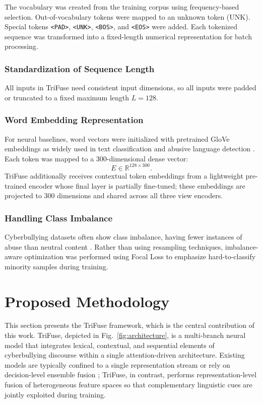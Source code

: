 The vocabulary was created from the training corpus using frequency-based selection. Out-of-vocabulary tokens were mapped to an unknown token (UNK). Special tokens \texttt{<PAD>}, \texttt{<UNK>}, \texttt{<BOS>}, and \texttt{<EOS>} were added. Each tokenized sequence was transformed into a fixed-length numerical representation for batch processing.

\subsubsection{Standardization of Sequence Length}

All inputs in TriFuse need consistent input dimensions, so all inputs were padded or truncated to a fixed maximum length $L = 128$.

\subsubsection{Word Embedding Representation}

For neural baselines, word vectors were initialized with pretrained GloVe embeddings as widely used in text classification and abusive language detection \cite{ref28, ref29}. Each token was mapped to a 300-dimensional dense vector:
\[
E \in \mathbb{R}^{128 \times 300}.
\]
TriFuse additionally receives contextual token embeddings from a lightweight pre-trained encoder whose final layer is partially fine-tuned; these embeddings are projected to 300 dimensions and shared across all three view encoders.

\subsubsection{Handling Class Imbalance}

Cyberbullying datasets often show class imbalance, having fewer instances of abuse than neutral content \cite{ref12}. Rather than using resampling techniques, imbalance-aware optimization was performed using Focal Loss \cite{ref23} to emphasize hard-to-classify minority samples during training.

\section{Proposed Methodology}

This section presents the TriFuse framework, which is the central contribution of this work. TriFuse, depicted in Fig.~\ref{fig:architecture}, is a multi-branch neural model that integrates lexical, contextual, and sequential elements of cyberbullying discourse within a single attention-driven architecture. Existing models are typically confined to a single representation stream \cite{ref7, ref8} or rely on decision-level ensemble fusion \cite{ref14}; TriFuse, in contrast, performs representation-level fusion of heterogeneous feature spaces so that complementary linguistic cues are jointly exploited during training.

